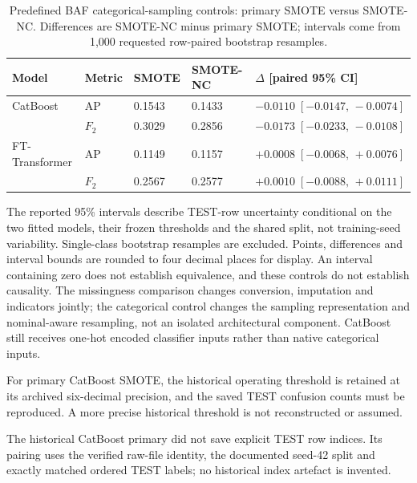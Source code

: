 \begin{table}[htbp]
\centering
\caption{Predefined BAF categorical-sampling controls: primary SMOTE versus SMOTE-NC. Differences are SMOTE-NC minus primary SMOTE; intervals come from 1,000 requested row-paired bootstrap resamples.}
\label{tab:baf_smotenc_control}
\begingroup\small
\setlength{\tabcolsep}{3pt}
\renewcommand{\arraystretch}{1.12}
\begin{tabular}{@{}p{26mm}p{12mm}p{18mm}p{23mm}p{55mm}@{}}
\toprule
Model & Metric & SMOTE & SMOTE-NC & $\Delta$ [paired 95\% CI] \\
\midrule
CatBoost & AP & 0.1543 & 0.1433 & $-0.0110\;[-0.0147,\,-0.0074]$ \\
 & $F_2$ & 0.3029 & 0.2856 & $-0.0173\;[-0.0233,\,-0.0108]$ \\
\addlinespace[3pt]
FT-Transformer & AP & 0.1149 & 0.1157 & $+0.0008\;[-0.0068,\,+0.0076]$ \\
 & $F_2$ & 0.2567 & 0.2577 & $+0.0010\;[-0.0088,\,+0.0111]$ \\
\bottomrule
\end{tabular}
\endgroup
\end{table}

The reported 95\% intervals describe TEST-row uncertainty conditional on the two fitted models, their frozen thresholds and the shared split, not training-seed variability. Single-class bootstrap resamples are excluded. Points, differences and interval bounds are rounded to four decimal places for display. An interval containing zero does not establish equivalence, and these controls do not establish causality. The missingness comparison changes conversion, imputation and indicators jointly; the categorical control changes the sampling representation and nominal-aware resampling, not an isolated architectural component. CatBoost still receives one-hot encoded classifier inputs rather than native categorical inputs.

For primary CatBoost SMOTE, the historical operating threshold is retained at its archived six-decimal precision, and the saved TEST confusion counts must be reproduced. A more precise historical threshold is not reconstructed or assumed.

The historical CatBoost primary did not save explicit TEST row indices. Its pairing uses the verified raw-file identity, the documented seed-42 split and exactly matched ordered TEST labels; no historical index artefact is invented.
